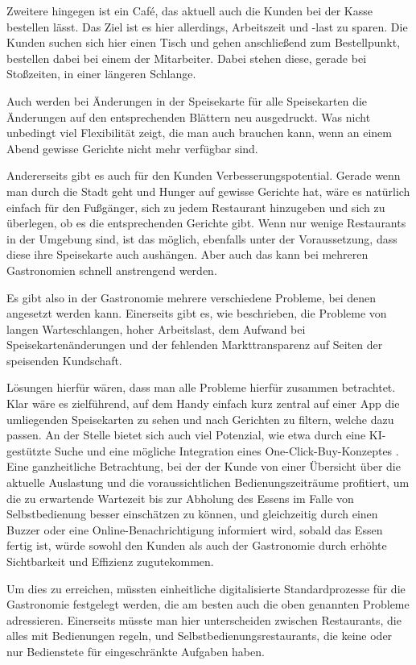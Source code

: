 Zweitere hingegen ist ein Café, das aktuell auch die Kunden bei der Kasse bestellen lässt. Das Ziel ist es hier allerdings, Arbeitszeit und -last zu sparen. Die Kunden suchen sich hier einen Tisch und gehen anschließend zum Bestellpunkt, bestellen dabei bei einem der Mitarbeiter. Dabei stehen diese, gerade bei Stoßzeiten, in einer längeren Schlange.

Auch werden bei Änderungen in der Speisekarte für alle Speisekarten die Änderungen auf den entsprechenden Blättern neu ausgedruckt. Was nicht unbedingt viel Flexibilität zeigt, die man auch brauchen kann, wenn an einem Abend gewisse Gerichte nicht mehr verfügbar sind.

Andererseits gibt es auch für den Kunden Verbesserungspotential. Gerade wenn man durch die Stadt geht und Hunger auf gewisse Gerichte hat, wäre es natürlich einfach für den Fußgänger, sich zu jedem Restaurant hinzugeben und sich zu überlegen, ob es die entsprechenden Gerichte gibt. Wenn nur wenige Restaurants in der Umgebung sind, ist das möglich, ebenfalls unter der Voraussetzung, dass diese ihre Speisekarte auch aushängen. Aber auch das kann bei mehreren Gastronomien schnell anstrengend werden.

Es gibt also in der Gastronomie mehrere verschiedene Probleme, bei denen angesetzt werden kann. Einerseits gibt es, wie beschrieben, die Probleme von langen Warteschlangen, hoher Arbeitslast, dem Aufwand bei Speisekartenänderungen und der fehlenden Markttransparenz auf Seiten der speisenden Kundschaft.

Lösungen hierfür wären, dass man alle Probleme hierfür zusammen betrachtet. Klar wäre es zielführend, auf dem Handy einfach kurz zentral auf einer App die umliegenden Speisekarten zu sehen und nach Gerichten zu filtern, welche dazu passen. An der Stelle bietet sich auch viel Potenzial, wie etwa durch eine KI-gestützte Suche und eine mögliche Integration eines One-Click-Buy-Konzeptes \citep[vgl.][]{amazon_oneclick_2025}. Eine ganzheitliche Betrachtung, bei der der Kunde von einer Übersicht über die aktuelle Auslastung und die voraussichtlichen Bedienungszeiträume profitiert, um die zu erwartende Wartezeit bis zur Abholung des Essens im Falle von Selbstbedienung besser einschätzen zu können, und gleichzeitig durch einen Buzzer oder eine Online-Benachrichtigung informiert wird, sobald das Essen fertig ist, würde sowohl den Kunden als auch der Gastronomie durch erhöhte Sichtbarkeit und Effizienz zugutekommen.

Um dies zu erreichen, müssten einheitliche digitalisierte Standardprozesse für die Gastronomie festgelegt werden, die am besten auch die oben genannten Probleme adressieren. Einerseits müsste man hier unterscheiden zwischen Restaurants, die alles mit Bedienungen regeln, und Selbstbedienungsrestaurants, die keine oder nur Bedienstete für eingeschränkte Aufgaben haben.

